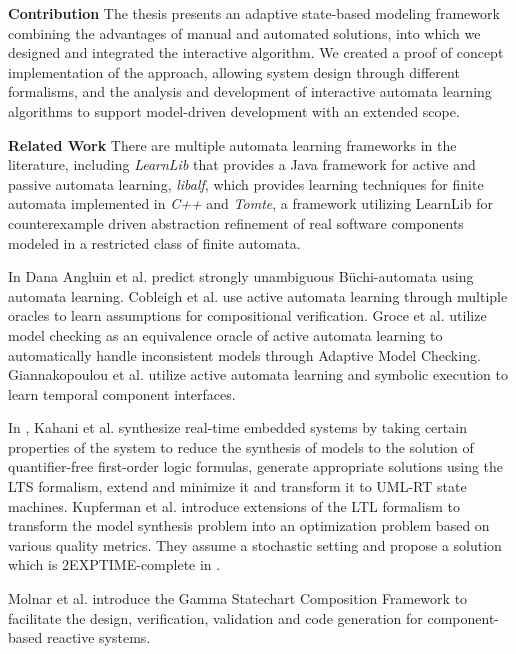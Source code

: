 \textbf{Contribution} The thesis presents an adaptive state-based modeling framework combining the advantages of manual and automated solutions, into which we designed and integrated the interactive algorithm. We created a proof of concept implementation of the approach, allowing system design through different formalisms, and the analysis and development of interactive automata learning algorithms to support model-driven development with an extended scope.
\clearpage

\textbf{Related Work} There are multiple automata learning frameworks in the literature, including
\emph{LearnLib}\cite{10.1007/978-3-319-21690-4_32} that provides a Java framework for active and passive automata learning, \emph{libalf}, which provides learning techniques for finite automata implemented in \emph{C++} and \emph{Tomte}\cite{aarts2012automata}, a framework utilizing LearnLib for counterexample driven abstraction refinement of real software components modeled in a restricted class of finite automata.

In \cite{angluin2020strongly} Dana Angluin et al. predict strongly unambiguous Büchi-automata using automata learning. Cobleigh et al. use active automata learning through multiple oracles to learn assumptions for compositional verification\cite{cobleigh2003learning}. 
Groce et al. utilize model checking as an equivalence oracle of active automata learning to automatically handle inconsistent models through Adaptive Model Checking\cite{groce2002adaptive}. Giannakopoulou et al. utilize active automata learning and symbolic execution to learn temporal component interfaces\cite{giannakopoulou2012symbolic}.

In \cite{kahaninafiseh}, Kahani et al. synthesize real-time embedded systems by taking certain properties of the system to reduce the synthesis of models to the solution of quantifier-free first-order logic formulas, generate appropriate solutions using the LTS formalism, extend and minimize it and transform it to UML-RT state machines.
Kupferman et al. introduce extensions of the LTL formalism to transform the model synthesis problem into an optimization problem based on various quality metrics. They assume a stochastic setting and propose a solution which is 2EXPTIME-complete in \cite{kupferman}.

Molnar et al. introduce the Gamma Statechart Composition Framework to facilitate the design, verification, validation and code generation for component-based reactive systems\cite{DBLP:conf/icse/MolnarGVMV18}.


